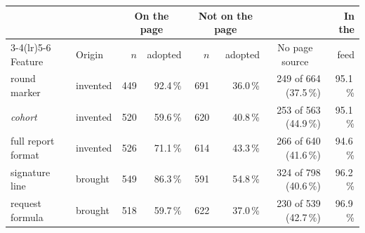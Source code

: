 \begin{tabular}{llrrrrrr}
\toprule
& & \multicolumn{2}{c}{On the page} & \multicolumn{2}{c}{Not on the page} & & In the \\
\cmidrule(lr){3-4}\cmidrule(lr){5-6}
Feature & Origin & $n$ & adopted & $n$ & adopted & \multicolumn{1}{c}{No page source} & feed \\
\midrule
round marker & invented & 449 & 92.4\,\% & 691 & 36.0\,\% & 249 of 664 (37.5\,\%) & 95.1\,\% \\
\emph{cohort} & invented & 520 & 59.6\,\% & 620 & 40.8\,\% & 253 of 563 (44.9\,\%) & 95.1\,\% \\
full report format & invented & 526 & 71.1\,\% & 614 & 43.3\,\% & 266 of 640 (41.6\,\%) & 94.6\,\% \\
signature line & brought & 549 & 86.3\,\% & 591 & 54.8\,\% & 324 of 798 (40.6\,\%) & 96.2\,\% \\
request formula & brought & 518 & 59.7\,\% & 622 & 37.0\,\% & 230 of 539 (42.7\,\%) & 96.9\,\% \\
\bottomrule
\end{tabular}
